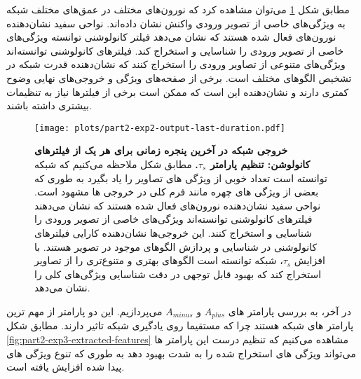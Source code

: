                 مطابق شکل
                \ref{fig:part2-exp2-output-last-duration} 
                می‌توان مشاهده کرد که نورون‌های مختلف در عمق‌های مختلف شبکه به ویژگی‌های خاصی از تصویر ورودی واکنش نشان داده‌اند. نواحی سفید نشان‌دهنده نورون‌های فعال شده هستند که نشان می‌دهد فیلتر کانولوشنی توانسته ویژگی‌های خاصی از تصویر ورودی را شناسایی و استخراج کند. فیلترهای کانولوشنی توانسته‌اند ویژگی‌های متنوعی از تصاویر ورودی را استخراج کنند که نشان‌دهنده قدرت شبکه در تشخیص الگوهای مختلف است. برخی از صفحه‌های ویژگی و خروجی‌های نهایی وضوح کمتری دارند و نشان‌دهنده این است که ممکن است برخی از فیلترها نیاز به تنظیمات بیشتری داشته باشند.

                \begin{figure}[!ht]
                    \centering
                    \texttt{[image: plots/part2-exp2-output-last-duration.pdf]} 
                    \captionsetup{width=.9\linewidth}
                    \caption{\textbf{ خروجی شبکه در آخرین پنجره زمانی برای هر یک از   فیلترهای کانولوشن: تنظیم پارامتر $\tau_s$. } مطابق شکل ملاحظه می‌کنیم که شبکه توانسته است تعداد خوبی از ویژگی های تصاویر را یاد بگیرد به طوری که بعضی از ویژگی های چهره مانند فرم کلی در خروجی ها مشهود است. نواحی سفید نشان‌دهنده نورون‌های فعال شده هستند که نشان می‌دهند فیلترهای کانولوشنی توانسته‌اند ویژگی‌های خاصی از تصویر ورودی را شناسایی و استخراج کنند. این خروجی‌ها نشان‌دهنده کارایی فیلترهای کانولوشنی در شناسایی و پردازش الگوهای موجود در تصویر هستند. با افزایش $\tau_s$، شبکه توانسته است الگوهای بهتری و متنوع‌تری را از تصاویر استخراج کند که بهبود قابل توجهی در دقت شناسایی ویژگی‌های کلی را نشان می‌دهد.
                    }
                    \label{fig:part2-exp2-output-last-duration}
                \end{figure}

                در آخر، به بررسی پارامتر های 
                $A_{plus}$ و $A_{minus}$ 
                می‌پردازیم. این دو پارامتر از مهم ترین پارامتر های شبکه هستند چرا که مستقیما روی یادگیری شبکه تاثیر دارند. مطابق  شکل 
                \ref{fig:part2-exp3-extracted-features} 
                مشاهده می‌کنیم که تنظیم درست این پارامتر ها می‌تواند ویژگی های استخراج شده را به شدت بهبود دهد به طوری که تنوع ویژگی های پیدا شده افزایش یافته است.

